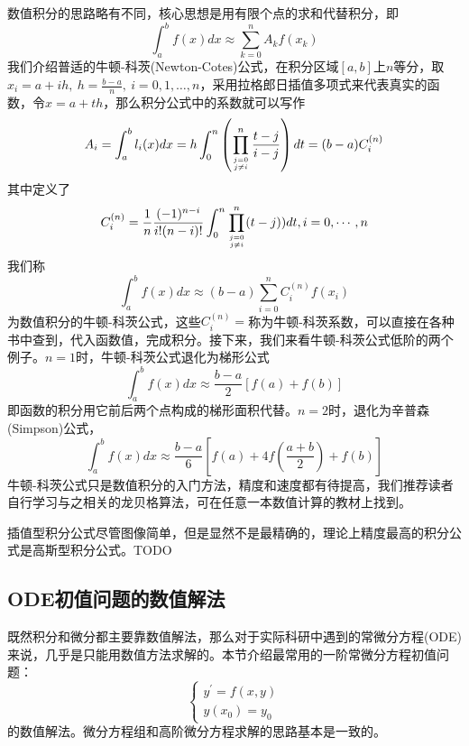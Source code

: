 \documentclass[12pt,a4paper,openany,twoside]{book}
\numberwithin{equation}{section}
\begin{document}
      数值积分的思路略有不同，核心思想是用有限个点的求和代替积分，即
      \begin{equation}
        \int_{a}^{b} f(x) d x \approx \sum_{k=0}^{n} A_{k} f\left(x_{k}\right)
      \end{equation}
      我们介绍普适的牛顿-科茨(Newton-Cotes)公式，在积分区域$[a,b]$上$n$等分，取$x_i=a+ih,\ h=\frac{b-a}{n},\ i =0,1,\dots,n$，采用拉格郎日插值多项式来代表真实的函数，令$x=a+th$，那么积分公式中的系数就可以写作
      \begin{equation}
        A_{i}=\int_{a}^{b} l_{i}(x) d x=h \int_{0}^{n}\left(\prod_{j=0 \atop j \neq i}^{n} \frac{t-j}{i-j}\right) d t=(b-a) C_{i}^{(n)}
      \end{equation}
      其中定义了
      \begin{equation}
        C_{i}^{(n)}=\frac{1}{n} \frac{(-1)^{n-i}}{i !(n-i) !} \int_{0}^{n} \prod_{j=0 \atop j \neq i}^{n}(t-j) ) d t, i=0, \cdots, n
      \end{equation}
      我们称
      \begin{equation}
        \int_{a}^{b} f(x) d x \approx(b-a) \sum_{i=0}^{n} C_{i}^{(n)} f\left(x_{i}\right)
      \end{equation}
      为数值积分的牛顿-科茨公式，这些$C_{i}^{(n)}=$称为牛顿-科茨系数，可以直接在各种书中查到，代入函数值，完成积分。接下来，我们来看牛顿-科茨公式低阶的两个例子。$n=1$时，牛顿-科茨公式退化为梯形公式
      \begin{equation}
        \int_{a}^{b} f(x) d x \approx \frac{b-a}{2}[f(a)+f(b)]
      \end{equation}
      即函数的积分用它前后两个点构成的梯形面积代替。$n=2$时，退化为辛普森(Simpson)公式，
      \begin{equation}
        \int_{a}^{b} f(x) d x \approx \frac{b-a}{6}\left[f(a)+4 f\left(\frac{a+b}{2}\right)+f(b)\right]
      \end{equation}
      牛顿-科茨公式只是数值积分的入门方法，精度和速度都有待提高，我们推荐读者自行学习与之相关的龙贝格算法，可在任意一本数值计算的教材上找到。

      插值型积分公式尽管图像简单，但是显然不是最精确的，理论上精度最高的积分公式是高斯型积分公式。TODO
    \subsection{ODE初值问题的数值解法}
      既然积分和微分都主要靠数值解法，那么对于实际科研中遇到的常微分方程(ODE)来说，几乎是只能用数值方法求解的。本节介绍最常用的一阶常微分方程初值问题：
      \begin{equation*}
        \left\{\begin{array}{l}{y^{\prime}=f(x, y)} \\ {y\left(x_{0}\right)=y_{0}}\end{array}\right.
      \end{equation*}
      的数值解法。微分方程组和高阶微分方程求解的思路基本是一致的。
\end{document}
